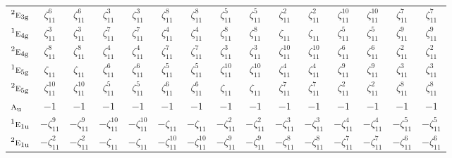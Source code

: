 \documentclass[10pt,a4paper]{article}
\numberwithin{equation}{section}
\newcommand{\irr}[1]{\text{\normalfont\scshape #1}}
\newcommand{\conjpair}[1]{{}^{#1}}
\newcommand{\ptag}[1]{\mathrm{#1}}
\newcommand{\rootunity}[1]{\zeta_{#1}}
\begin{document}
{\begin{longtable}{@{}lcccccccccccccc@{}}
$\conjpair{2}\irr{e}_{3\ptag{g}}$ & $\rootunity{11}^{6}$ & $\rootunity{11}^{6}$ & $\rootunity{11}^{3}$ & $\rootunity{11}^{3}$ & $\rootunity{11}^{8}$ & $\rootunity{11}^{8}$ & $\rootunity{11}^{5}$ & $\rootunity{11}^{5}$ & $\rootunity{11}^{2}$ & $\rootunity{11}^{2}$ & $\rootunity{11}^{10}$ & $\rootunity{11}^{10}$ & $\rootunity{11}^{7}$ & $\rootunity{11}^{7}$\\
$\conjpair{1}\irr{e}_{4\ptag{g}}$ & $\rootunity{11}^{3}$ & $\rootunity{11}^{3}$ & $\rootunity{11}^{7}$ & $\rootunity{11}^{7}$ & $\rootunity{11}^{4}$ & $\rootunity{11}^{4}$ & $\rootunity{11}^{8}$ & $\rootunity{11}^{8}$ & $\rootunity{11}$ & $\rootunity{11}$ & $\rootunity{11}^{5}$ & $\rootunity{11}^{5}$ & $\rootunity{11}^{9}$ & $\rootunity{11}^{9}$\\
$\conjpair{2}\irr{e}_{4\ptag{g}}$ & $\rootunity{11}^{8}$ & $\rootunity{11}^{8}$ & $\rootunity{11}^{4}$ & $\rootunity{11}^{4}$ & $\rootunity{11}^{7}$ & $\rootunity{11}^{7}$ & $\rootunity{11}^{3}$ & $\rootunity{11}^{3}$ & $\rootunity{11}^{10}$ & $\rootunity{11}^{10}$ & $\rootunity{11}^{6}$ & $\rootunity{11}^{6}$ & $\rootunity{11}^{2}$ & $\rootunity{11}^{2}$\\
$\conjpair{1}\irr{e}_{5\ptag{g}}$ & $\rootunity{11}$ & $\rootunity{11}$ & $\rootunity{11}^{6}$ & $\rootunity{11}^{6}$ & $\rootunity{11}^{5}$ & $\rootunity{11}^{5}$ & $\rootunity{11}^{10}$ & $\rootunity{11}^{10}$ & $\rootunity{11}^{4}$ & $\rootunity{11}^{4}$ & $\rootunity{11}^{9}$ & $\rootunity{11}^{9}$ & $\rootunity{11}^{3}$ & $\rootunity{11}^{3}$\\
$\conjpair{2}\irr{e}_{5\ptag{g}}$ & $\rootunity{11}^{10}$ & $\rootunity{11}^{10}$ & $\rootunity{11}^{5}$ & $\rootunity{11}^{5}$ & $\rootunity{11}^{6}$ & $\rootunity{11}^{6}$ & $\rootunity{11}$ & $\rootunity{11}$ & $\rootunity{11}^{7}$ & $\rootunity{11}^{7}$ & $\rootunity{11}^{2}$ & $\rootunity{11}^{2}$ & $\rootunity{11}^{8}$ & $\rootunity{11}^{8}$\\
$\irr{a}_{\ptag{u}}$ & $-1$ & $-1$ & $-1$ & $-1$ & $-1$ & $-1$ & $-1$ & $-1$ & $-1$ & $-1$ & $-1$ & $-1$ & $-1$ & $-1$\\
$\conjpair{1}\irr{e}_{1\ptag{u}}$ & $-\rootunity{11}^{9}$ & $-\rootunity{11}^{9}$ & $-\rootunity{11}^{10}$ & $-\rootunity{11}^{10}$ & $-\rootunity{11}$ & $-\rootunity{11}$ & $-\rootunity{11}^{2}$ & $-\rootunity{11}^{2}$ & $-\rootunity{11}^{3}$ & $-\rootunity{11}^{3}$ & $-\rootunity{11}^{4}$ & $-\rootunity{11}^{4}$ & $-\rootunity{11}^{5}$ & $-\rootunity{11}^{5}$\\
$\conjpair{2}\irr{e}_{1\ptag{u}}$ & $-\rootunity{11}^{2}$ & $-\rootunity{11}^{2}$ & $-\rootunity{11}$ & $-\rootunity{11}$ & $-\rootunity{11}^{10}$ & $-\rootunity{11}^{10}$ & $-\rootunity{11}^{9}$ & $-\rootunity{11}^{9}$ & $-\rootunity{11}^{8}$ & $-\rootunity{11}^{8}$ & $-\rootunity{11}^{7}$ & $-\rootunity{11}^{7}$ & $-\rootunity{11}^{6}$ & $-\rootunity{11}^{6}$\\

\end{longtable}}
\end{document}
